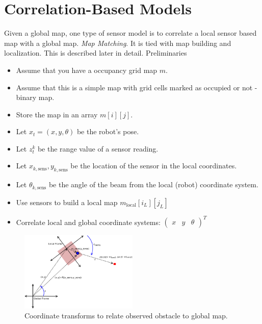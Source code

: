 \hypertarget{correlation-based-models}{%
\section{Correlation-Based Models}\label{correlation-based-models}}

Given a global map, one type of sensor model is to correlate a local
sensor based map with a global map. \emph{Map Matching}. It is tied with
map building and localization. This is described later in detail.
Preliminaries

\begin{itemize}
\tightlist
\item
  Assume that you have a occupancy grid map \(m\).
\item
  Assume that this is a simple map with grid cells marked as occupied or
  not - binary map.
\item
  Store the map in an array \(m[i][j]\).
\item
  Let \(x_t = (x,y,\theta)\) be the robot's pose.
\item
  Let \(z_t^k\) be the range value of a sensor reading.
\item
  Let \(x_{k,\mbox{sens}}, y_{k,\mbox{sens}}\) be the location of the
  sensor in the local coordinates.
\item
  Let \(\theta_{k,\mbox{sens}}\) be the angle of the beam from the local
  (robot) coordinate system.
\item
  Use sensors to build a local map \(m_{\mbox{local}}[i_L][j_L]\)
\item
  Correlate local and global coordinate systems:
  \(\begin{pmatrix}x & y & \theta\end{pmatrix}^T\)
\end{itemize}

\begin{figure}
\centering
\includegraphics[width=0.5\textwidth,height=\textheight]{LocalizationFigures/coords.png}
\caption{Coordinate transforms to relate observed obstacle to global
map.}
\end{figure}

